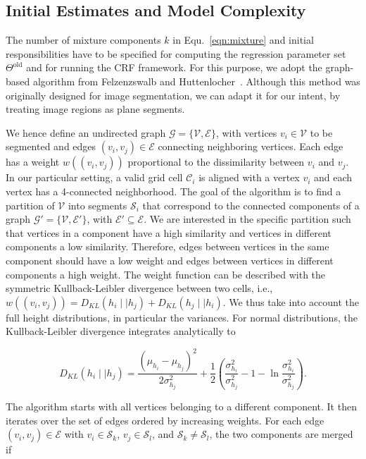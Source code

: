 \subsection{Initial Estimates and Model Complexity}

The number of mixture components $k$ in Equ.~\eqref{eqn:mixture} and initial
responsibilities have to be specified for computing the regression parameter set
$\Theta^\text{old}$ and for running the CRF framework. For this purpose, we
adopt the graph-based algorithm from Felzenzswalb and
Huttenlocher~\cite{felzenszwalb04efficient}. Although this method was originally
designed for image segmentation, we can adapt it for our intent, by treating
image regions as plane segments.

We hence define an undirected graph $\mathcal{G}=\{\mathcal{V},\mathcal{E}\}$,
with vertices $v_i\in\mathcal{V}$ to be segmented and edges $(v_i,v_j)
\in\mathcal{E}$ connecting neighboring vertices. Each edge has a weight
$w((v_i,v_j))$ proportional to the dissimilarity between $v_i$ and $v_j$. In our
particular setting, a valid grid cell $\mathcal{C}_i$ is aligned with a
vertex $v_i$ and each vertex has a 4-connected neighborhood. The goal of the
algorithm is to find a partition of $\mathcal{V}$ into segments $\mathcal{S}_i$
that correspond to the connected components of a graph
$\mathcal{G}'=\{\mathcal{V},\mathcal{E}'\}$, with $\mathcal{E}'\subseteq
\mathcal{E}$. We are interested in the specific
partition such that vertices in a component have a high similarity and vertices
in different components a low similarity. Therefore, edges between vertices in
the same component should have a low weight and edges between vertices in
different components a high weight. The weight function can be described with
the symmetric Kullback-Leibler divergence between two cells, i.e.,
$w((v_i,v_j))=D_{KL}(h_i\mid\mid h_j)+D_{KL}(h_j\mid\mid h_i)$. We thus take
into account the full height distributions, in particular the variances. For
normal distributions, the Kullback-Leibler divergence integrates analytically to

\begin{equation}
\label{eqn:kl}
D_{KL}(h_i\mid\mid h_j)=\frac{(\mu_{h_i}-\mu_{h_j})^2}{2\sigma_{h_j}^2}+
\frac{1}{2}(\frac{\sigma_{h_i}^2}{\sigma_{h_j}^2}-1-\ln\frac{\sigma_{h_i}^2}
{\sigma_{h_j}^2}).
\end{equation}

The algorithm starts with all vertices belonging to a different component. It
then iterates over the set of edges ordered by increasing weights. For each
edge $(v_i,v_j)\in\mathcal{E}$ with $v_i\in\mathcal{S}_k$,
$v_j\in\mathcal{S}_l$, and $\mathcal{S}_k\neq\mathcal{S}_l$, the two components
are merged if

